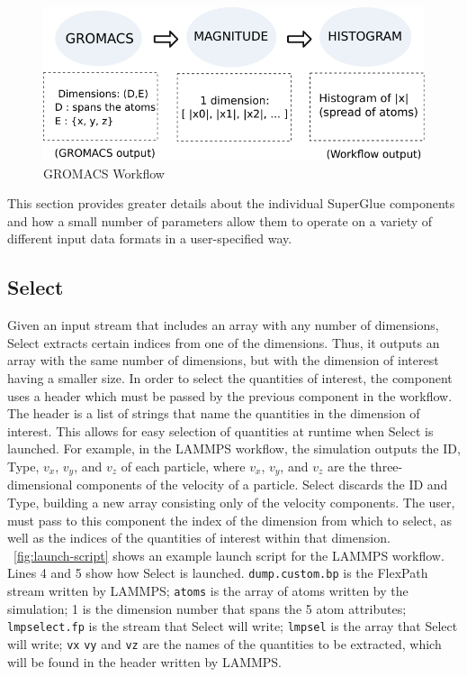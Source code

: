 \begin{figure}
  \center
  \includegraphics[width=\columnwidth]{fig/wflow_gromacs}
  \vspace{-0.25in}
  \caption{GROMACS Workflow}
  \label{fig:gromacs-workflow}
  \vspace{-0.15in}
\end{figure}



This section provides greater details about the individual SuperGlue components
and how a small number of
parameters allow them to operate on a variety
of different input data formats in
a user-specified way.

\subsection{Select}

Given an input stream that includes an array with
any number of dimensions,
Select extracts certain indices from one of
the dimensions. Thus, it outputs an array
with the same number of dimensions,
but with the dimension of interest having a
smaller size. In order to select the quantities of
interest, the component uses a header which
must be passed by the previous component in the
workflow. The header is a list of strings that
name the quantities in the
dimension of interest. This allows for easy
selection of quantities at runtime when
Select is launched. For example, in the LAMMPS workflow,
the simulation outputs the ID, Type, $v_{x}$, $v_y$, and $v_z$
of each particle, where $v_{x}$, $v_y$, and $v_z$ are the
three-dimensional components of the velocity of a particle.
Select discards the ID and Type, building a new
array consisting only of the velocity components.
The user, must pass to
this component the index of the dimension
from which to select, as well as the
indices of the quantities of interest within that dimension.
~\autoref{fig:launch-script} shows an example launch
script for the LAMMPS workflow. Lines 4 and 5
show how Select is launched. \verb|dump.custom.bp|
is the FlexPath stream written by LAMMPS; \verb|atoms|
is the array of atoms written by the simulation; 
1 is the dimension number that spans the 5 atom attributes;
\verb|lmpselect.fp| is the stream that Select will write;
\verb|lmpsel| is the array that Select will write;
\verb|vx| \verb|vy| and \verb|vz| are the
names of the quantities
to be extracted, which will be found in the
header written by LAMMPS.

